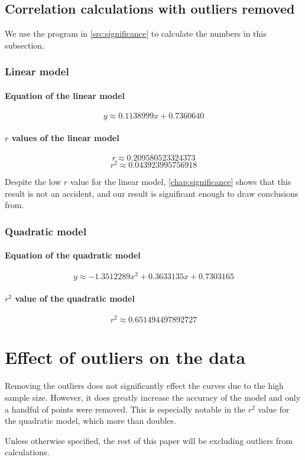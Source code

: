 \subsection{Correlation calculations with outliers removed}
We use the program in \vref{src:significance} to calculate the numbers in this subsection.

\subsubsection{Linear model}
\paragraph{Equation of the linear model}
\[y \approx \num{0.1138999}x + \num{0.7360640}\]
\paragraph{$r$ values of the linear model}
\[r \approx \num{0.209580523324373}\]
\[r^2 \approx \num{0.043923995756918}\]

Despite the low $r$ value for the linear model, \vref{chap:significance} shows that this result is not an accident, and our result is significant enough to draw conclusions from.

\subsubsection{Quadratic model}
\paragraph{Equation of the quadratic model}
\[y \approx \num{-1.3512289}x^2 + \num{0.3633135}x + \num{0.7303165}\]
\paragraph{$r^2$ value of the quadratic model}
\[r^2 \approx \num{0.651494497892727}\]

\section{Effect of outliers on the data}
Removing the outliers does not significantly effect the curves due to the high sample size.
However, it does greatly increase the accuracy of the model and only a handful of points were removed.
This is especially notable in the $r^2$ value for the quadratic model, which more than doubles.

Unless otherwise specified, the rest of this paper will be excluding outliers from calculations.
